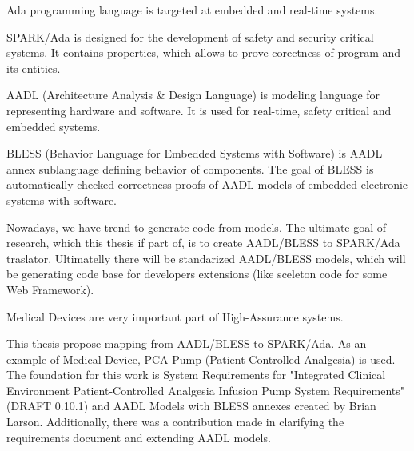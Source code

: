 
\pagestyle{empty}
\setlength{\baselineskip}{0.8cm}




Ada programming language is targeted at embedded and real-time systems.

SPARK/Ada is designed for the development of safety and security critical systems. It contains properties, which allows to prove corectness of program and its entities.



AADL (Architecture Analysis \& Design Language) is modeling language for representing hardware and software. It is used for real-time, safety critical and embedded systems.

BLESS (Behavior Language for Embedded Systems with Software) is AADL annex sublanguage defining behavior of components. The goal of BLESS is automatically-checked correctness proofs of AADL models of embedded electronic systems with software.

Nowadays, we have trend to generate code from models. The ultimate goal of research, which this thesis if part of, is to create AADL/BLESS to SPARK/Ada traslator. Ultimatelly there will be standarized AADL/BLESS models, which will be generating code base for developers extensions (like sceleton code for some Web Framework).

Medical Devices are very important part of High-Assurance systems.

This thesis propose mapping from AADL/BLESS to SPARK/Ada. As an example of Medical Device, PCA Pump (Patient Controlled Analgesia) is used. The foundation for this work is System Requirements for "Integrated Clinical Environment Patient-Controlled Analgesia Infusion Pump System Requirements" (DRAFT 0.10.1) \cite{PcaReq} and AADL Models with BLESS annexes created by Brian Larson. Additionally, there was a contribution made in clarifying the requirements document and extending AADL models.

